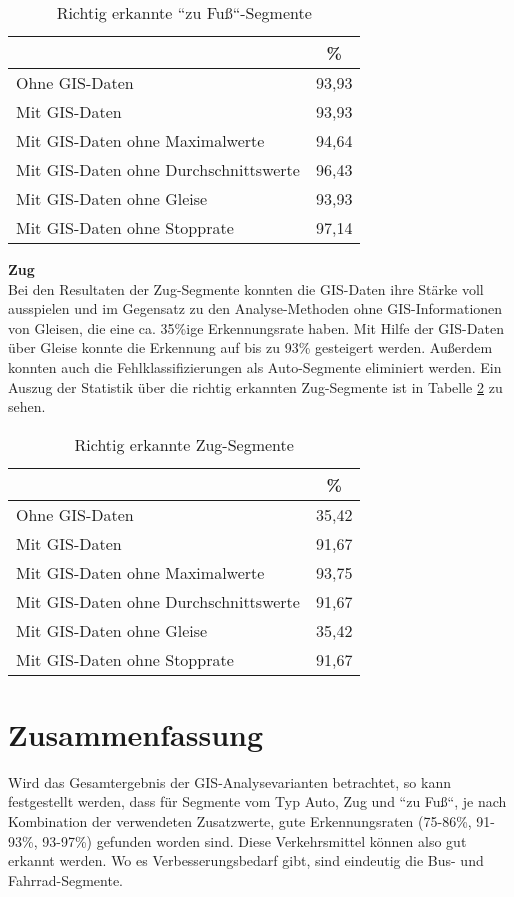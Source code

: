 \begin{table}[h]
\centering
\begin{tabular}{|l|c|}
\hline
 & \% \\ \hline
Ohne GIS-Daten & 93,93 \\ \hline
Mit GIS-Daten & 93,93 \\ \hline
Mit GIS-Daten ohne Maximalwerte & 94,64 \\ \hline
Mit GIS-Daten ohne Durchschnittswerte & 96,43 \\ \hline
Mit GIS-Daten ohne Gleise & 93,93 \\ \hline
Mit GIS-Daten ohne Stopprate & 97,14 \\ \hline
\end{tabular}
\caption{Richtig erkannte ``zu Fuß``-Segmente}
\label{result-foot}
\end{table}

\textbf{Zug} \\
Bei den Resultaten der Zug-Segmente konnten die GIS-Daten ihre Stärke voll ausspielen und im Gegensatz zu den Analyse-Methoden ohne GIS-Informationen von Gleisen, die eine ca. 35\%ige Erkennungsrate haben. Mit Hilfe der GIS-Daten über Gleise konnte die Erkennung auf bis zu 93\% gesteigert werden. Außerdem konnten auch die Fehlklassifizierungen als Auto-Segmente eliminiert werden. Ein Auszug der Statistik über die richtig erkannten Zug-Segmente ist in Tabelle \ref{result-train} zu sehen.

\begin{table}[h]
\centering
\begin{tabular}{|l|c|}
\hline
 & \% \\ \hline
Ohne GIS-Daten & 35,42 \\ \hline
Mit GIS-Daten & 91,67 \\ \hline
Mit GIS-Daten ohne Maximalwerte & 93,75 \\ \hline
Mit GIS-Daten ohne Durchschnittswerte & 91,67 \\ \hline
Mit GIS-Daten ohne Gleise & 35,42 \\ \hline
Mit GIS-Daten ohne Stopprate & 91,67 \\ \hline
\end{tabular}
\caption{Richtig erkannte Zug-Segmente}
\label{result-train}
\end{table}

\section{Zusammenfassung}
Wird das Gesamtergebnis der GIS-Analysevarianten betrachtet, so kann festgestellt werden, dass für Segmente vom Typ Auto, Zug und ``zu Fuß``, je nach Kombination der verwendeten Zusatzwerte,  gute Erkennungsraten (75-86\%, 91-93\%, 93-97\%) gefunden worden sind. Diese Verkehrsmittel können also  gut erkannt werden. Wo es Verbesserungsbedarf gibt, sind eindeutig die Bus- und Fahrrad-Segmente.  


